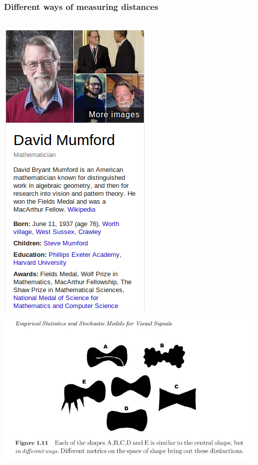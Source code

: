 \documentclass{beamer}
\begin{document}
\begin{frame}
\frametitle{Different ways of measuring distances}
\begin{columns}[c]
\includegraphics[width=\textwidth]{mumford}
\includegraphics[width=\textwidth]{mumford_fig}

\end{columns}
\end{frame}
\end{document}
